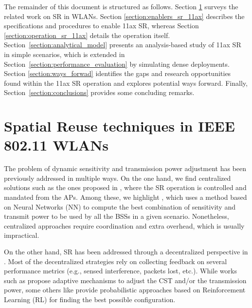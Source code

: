 \documentclass{ieeeaccess}
\begin{document}
The remainder of this document is structured as follows. Section \ref{section:previous_work_sr} surveys the related work on SR in WLANs. Section \ref{section:enablers_sr_11ax} describes the specifications and procedures to enable 11ax SR, whereas Section \ref{section:operation_sr_11ax} details the operation itself. Section~\ref{section:analytical_model} presents an analysis-based study of 11ax SR in simple scenarios, which is extended in Section~\ref{section:performance_evaluation} by simulating dense deployments. Section \ref{section:ways_forwad} identifies the gaps and research opportunities found within the 11ax SR operation and explores potential ways forward. Finally, Section~\ref{section:conclusions} provides some concluding remarks.

\section{Spatial Reuse techniques in IEEE 802.11 WLANs}%
\label{section:previous_work_sr}
The problem of dynamic sensitivity and transmission power adjustment has been previously addressed in multiple ways. On the one hand, we find centralized solutions such as the ones proposed in \cite{li2011achieving, jamil2016novel, nakahira2014centralized}, where the SR operation is controlled and mandated from the APs. Among these, we highlight \cite{jamil2016novel}, which uses a method based on Neural Networks (NN) to compute the best combination of sensitivity and transmit power to be used by all the BSSs in a given scenario. Nonetheless, centralized approaches require coordination and extra overhead, which is usually impractical.

On the other hand, SR has been addressed through a decentralized perspective in \cite{chevillat2005dynamic, tang2011improving, chau2017effective, wilhelmi2019collaborative, wilhelmi2019potential}. Most of the decentralized strategies rely on collecting feedback on several performance metrics (e.g., sensed interference, packets lost, etc.). While works such as \cite{chevillat2005dynamic, tang2011improving, chau2017effective} propose adaptive mechanisms to adjust the CST and/or the transmission power, some others like \cite{wilhelmi2019collaborative, wilhelmi2019potential} provide probabilistic approaches based on Reinforcement Learning (RL) for finding the best possible configuration.
\end{document}
